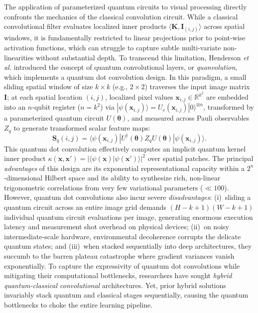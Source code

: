 \documentclass[journal]{IEEEtran}
\begin{document}
The application of parameterized quantum circuits to visual processing directly confronts the mechanics of the classical convolution circuit. While a classical convolutional filter evaluates localized inner products $\langle \mathbf{K}, \mathbf{I}_{(i,j)} \rangle$ across spatial windows, it is fundamentally restricted to linear projections prior to point-wise activation functions, which can struggle to capture subtle multi-variate non-linearities without substantial depth. To transcend this limitation, Henderson \textit{et al.} \cite{henderson2020quanvolutional} introduced the concept of quantum convolutional layers, or \textit{quanvolution}, which implements a quantum dot convolution design. In this paradigm, a small sliding spatial window of size $k \times k$ (e.g., $2 \times 2$) traverses the input image matrix $\mathbf{I}$; at each spatial location $(i, j)$, localized pixel values $\mathbf{x}_{i,j} \in \mathbb{R}^{k^2}$ are embedded into an $n$-qubit register ($n = k^2$) via $|\psi(\mathbf{x}_{i,j})\rangle = U_e(\mathbf{x}_{i,j}) |0\rangle^{\otimes n}$, transformed by a parameterized quantum circuit $U(\boldsymbol{\theta})$, and measured across Pauli observables $Z_q$ to generate transformed scalar feature maps:
\begin{equation}
\mathbf{S}_q(i, j) = \langle \psi(\mathbf{x}_{i,j}) | U^\dagger(\boldsymbol{\theta}) Z_q U(\boldsymbol{\theta}) | \psi(\mathbf{x}_{i,j}) \rangle.
\label{eq:quantum_dot_conv}
\end{equation}
This quantum dot convolution effectively computes an implicit quantum kernel inner product $\kappa(\mathbf{x}, \mathbf{x}') = |\langle \psi(\mathbf{x}) | \psi(\mathbf{x}') \rangle|^2$ over spatial patches. The principal \textit{advantages} of this design are its exponential representational capacity within a $2^n$-dimensional Hilbert space and its ability to synthesize rich, non-linear trigonometric correlations from very few variational parameters ($\ll 100$). However, quantum dot convolutions also incur severe \textit{disadvantages}: (i)~sliding a quantum circuit across an entire image grid demands $(H - k + 1)(W - k + 1)$ individual quantum circuit evaluations per image, generating enormous execution latency and measurement shot overhead on physical devices; (ii)~on noisy intermediate-scale hardware, environmental decoherence corrupts the delicate quantum states; and (iii)~when stacked sequentially into deep architectures, they succumb to the barren plateau catastrophe where gradient variances vanish exponentially. To capture the expressivity of quantum dot convolutions while mitigating their computational bottlenecks, researchers have sought \textit{hybrid quantum-classical convolutional} architectures. Yet, prior hybrid solutions invariably stack quantum and classical stages sequentially, causing the quantum bottlenecks to choke the entire learning pipeline.
\end{document}

